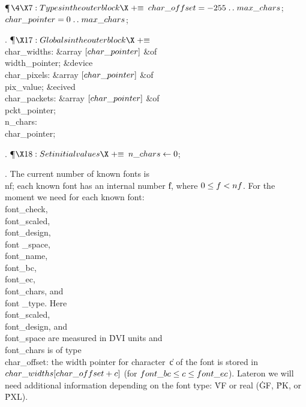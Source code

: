 \Y\P$\4\X7:Types in the outer block\X\mathrel{+}\S$\6
$\\{char\_offset}=-255\to\\{max\_chars}$;\6
$\\{char\_pointer}=0\to\\{max\_chars}$;\par
\fi

. \P$\X17:Globals in the outer block\X\mathrel{+}\S$\6
\4\\{char\_widths}: \&{array} $[\\{char\_pointer}]$ \1\&{of}\5
\\{width\_pointer};\2\6
\&{device} \\{char\_pixels}: \&{array} $[\\{char\_pointer}]$ \1\&{of}\5
\\{pix\_value};\2\6
\&{ecived}\6
\4\\{char\_packets}: \&{array} $[\\{char\_pointer}]$ \1\&{of}\5
\\{pckt\_pointer};\2\6
\4\\{n\_chars}: \\{char\_pointer};\par
\fi

. \P$\X18:Set initial values\X\mathrel{+}\S$\6
$\\{n\_chars}\K0$;\par
\fi

. The current number of known fonts is \\{nf}; each known font has an
internal number \|f, where $0\L\|f<\\{nf}$. For the moment we need for each
known font: \\{font\_check}, \\{font\_scaled}, \\{font\_design}, \\{font%
\_space},
\\{font\_name}, \\{font\_bc}, \\{font\_ec}, \\{font\_chars}, and \\{font%
\_type}.
Here \\{font\_scaled}, \\{font\_design}, and \\{font\_space} are measured in
\.{DVI} units and \\{font\_chars} is of type \\{char\_offset}:
the width pointer for character~\|c of the font is stored in
$\\{char\_widths}[\\{char\_offset}+\|c]$ (for $\\{font\_bc}\L\|c\L\\{font%
\_ec}$).
Lateron we will need additional information depending on the font type:
\.{VF} or real (\.{GF}, \.{PK}, or \.{PXL}).

